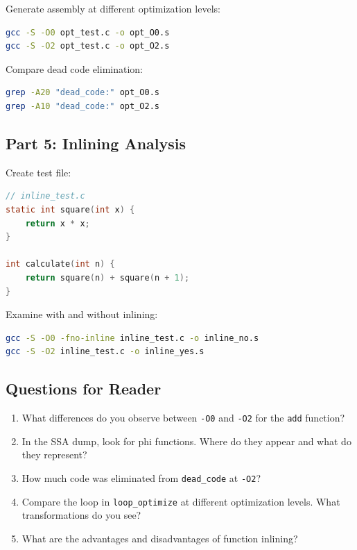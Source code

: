 Generate assembly at different optimization levels:

\begin{lstlisting}[language=bash]
gcc -S -O0 opt_test.c -o opt_O0.s
gcc -S -O2 opt_test.c -o opt_O2.s
\end{lstlisting}

Compare dead code elimination:

\begin{lstlisting}[language=bash]
grep -A20 "dead_code:" opt_O0.s
grep -A10 "dead_code:" opt_O2.s
\end{lstlisting}

\subsection{Part 5: Inlining Analysis}

Create test file:

\begin{lstlisting}[language=C]
// inline_test.c
static int square(int x) {
    return x * x;
}

int calculate(int n) {
    return square(n) + square(n + 1);
}
\end{lstlisting}

Examine with and without inlining:

\begin{lstlisting}[language=bash]
gcc -S -O0 -fno-inline inline_test.c -o inline_no.s
gcc -S -O2 inline_test.c -o inline_yes.s
\end{lstlisting}

\subsection{Questions for Reader}

\begin{enumerate}
\item What differences do you observe between \texttt{-O0} and \texttt{-O2} for the \texttt{add} function?
\item In the SSA dump, look for phi functions. Where do they appear and what do they represent?
\item How much code was eliminated from \texttt{dead\_code} at \texttt{-O2}?
\item Compare the loop in \texttt{loop\_optimize} at different optimization levels. What transformations do you see?
\item What are the advantages and disadvantages of function inlining?
\end{enumerate}

